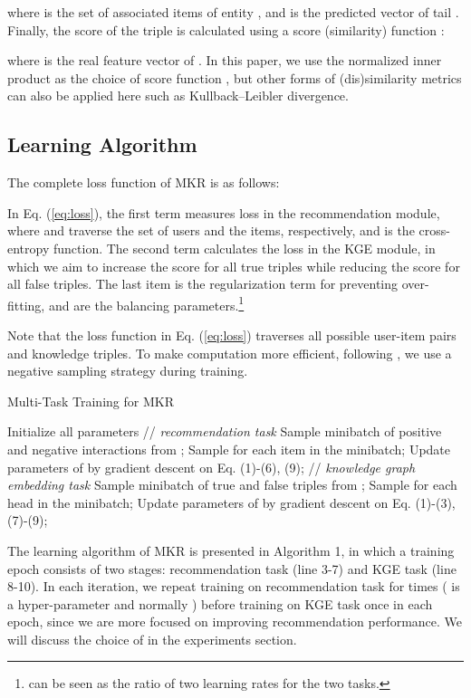 \documentclass[sigconf]{acmart}
\begin{document}
		where  is the set of associated items of entity , and  is the predicted vector of tail .
		Finally, the score of the triple  is calculated using a score (similarity) function :
		
		where  is the real feature vector of .
		In this paper, we use the normalized inner product  as the choice of score function \cite{misra2016cross}, but other forms of (dis)similarity metrics can also be applied here such as Kullback–Leibler divergence.
	
	
	\subsection{Learning Algorithm}
		The complete loss function of MKR is as follows:
		
			
		In Eq. (\ref{eq:loss}), the first term measures loss in the recommendation module, where  and  traverse the set of users and the items, respectively, and  is the cross-entropy function.
		The second term calculates the loss in the KGE module, in which we aim to increase the score for all true triples while reducing the score for all false triples.
		The last item is the regularization term for preventing over-fitting,  and  are the balancing parameters.\footnote{ can be seen as the ratio of two learning rates for the two tasks.}
			
		Note that the loss function in Eq. (\ref{eq:loss}) traverses all possible user-item pairs and knowledge triples.
		To make computation more efficient, following \cite{mikolov2013distributed}, we use a negative sampling strategy during training.
		\begin{algorithm}[t]
  		\caption{Multi-Task Training for MKR}
			\begin{algorithmic}[1]
				\STATE Initialize all parameters
					\STATEx \quad // \textit{recommendation task}
						\STATE Sample minibatch of positive and negative interactions from ;
						\STATE Sample  for each item  in the minibatch;
						\STATE Update parameters of  by gradient descent on Eq. (1)-(6), (9);
					\ENDFOR
					\STATEx \quad // \textit{knowledge graph embedding task}
					\STATE Sample minibatch of true and false triples from ;
					\STATE Sample  for each head  in the minibatch;
					\STATE Update parameters of  by gradient descent on Eq. (1)-(3), (7)-(9);
				\ENDFOR
			\end{algorithmic}
		\end{algorithm}		
		The learning algorithm of MKR is presented in Algorithm 1, in which a training epoch consists of two stages: recommendation task (line 3-7) and KGE task (line 8-10).
		In each iteration, we repeat training on recommendation task for  times ( is a hyper-parameter and normally ) before training on KGE task once in each epoch, since we are more focused on improving recommendation performance.
		We will discuss the choice of  in the experiments section.
		
\end{document}
